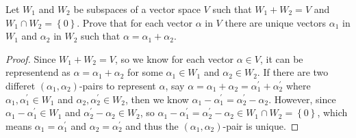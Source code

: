 \begin{problem}
    Let \(W_1\) and \(W_2\) be subspaces of a vector space \(V\) such that \(W_1 + W_2 = V\) and \(W_1 \cap W_2 = \left\{ 0 \right\} \). Prove that for each vector \(\alpha \) in \(V\) there are unique vectors \(\alpha _1\) in \(W_1\) and \(\alpha _2\) in \(W_2\) such that \(\alpha = \alpha _1 + \alpha _2\).
\end{problem}
\begin{proof}
    Since \(W_1 + W_2 = V\), so we know for each vector \(\alpha \in V\), it can be representend as \(\alpha = \alpha _1 + \alpha _2\) for some \(\alpha _1 \in W_1\) and \(\alpha _2 \in W_2\). If there are two differet \((\alpha_1, \alpha _2)\)-pairs to represent \(\alpha \), say \(\alpha = \alpha _1 + \alpha _2 = \alpha _1^{\prime}  + \alpha _2 ^{\prime} \) where \(\alpha _1, \alpha _1^{\prime} \in W_1\) and \(\alpha _2 , \alpha _2^{\prime}  \in W_2\), then we know \(\alpha _1 - \alpha _1^{\prime}  = \alpha _2^{\prime}  - \alpha _2 \). However, since \(\alpha _1 - \alpha _1^{\prime}  \in W_1\) and \(\alpha _2^{\prime}  - \alpha _2 \in W_2\), so \(\alpha _1 - \alpha _1^{\prime} = \alpha _2^{\prime} - \alpha _2 \in W_1 \cap W_2 = \left\{ 0 \right\} \), which means \(\alpha _1 = \alpha _1^{\prime} \) and \(\alpha _2 = \alpha _2^{\prime} \) and thus the \((\alpha _1, \alpha _2)\)-pair is unique.                
\end{proof}